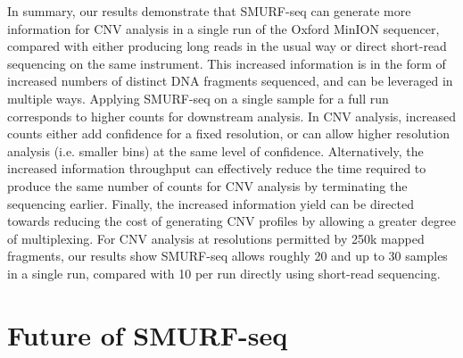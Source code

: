 In summary, our results demonstrate that SMURF-seq can generate more
information for CNV analysis in a single run of the Oxford MinION
sequencer, compared with either producing long reads in the usual way or
direct short-read sequencing on the same instrument.  This increased
information is in the form of increased numbers of distinct DNA
fragments sequenced, and can be leveraged in multiple ways. Applying
SMURF-seq on a single sample for a full run corresponds to higher counts
for downstream analysis. In CNV analysis, increased counts either add
confidence for a fixed resolution, or can allow higher resolution
analysis (i.e. smaller bins) at the same level of confidence.
Alternatively, the increased information throughput can effectively
reduce the time required to produce the same number of counts for CNV
analysis by terminating the sequencing earlier. Finally, the increased
information yield can be directed towards reducing the cost of
generating CNV profiles by allowing a greater degree of multiplexing.
For CNV analysis at resolutions permitted by 250k mapped fragments, our
results show SMURF-seq allows roughly 20 and up to 30 samples in a
single run, compared with 10 per run directly using short-read
sequencing.

\section{Future of SMURF-seq}

